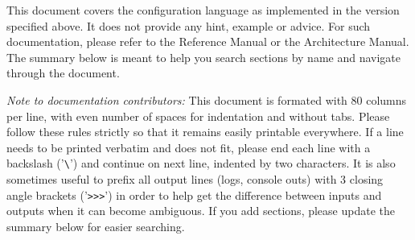 This document covers the configuration language as implemented in the version
specified above. It does not provide any hint, example or advice. For such
documentation, please refer to the Reference Manual or the Architecture Manual.
The summary below is meant to help you search sections by name and navigate
through the document.

\emph{Note to documentation contributors:}
This document is formated with 80 columns per line, with even number of
spaces for indentation and without tabs. Please follow these rules strictly
so that it remains easily printable everywhere. If a line needs to be
printed verbatim and does not fit, please end each line with a backslash
('\verb|\|') and continue on next line, indented by two characters. It is also
sometimes useful to prefix all output lines (logs, console outs) with 3
closing angle brackets ('\verb|>>>|') in order to help get the difference between
inputs and outputs when it can become ambiguous. If you add sections,
please update the summary below for easier searching.